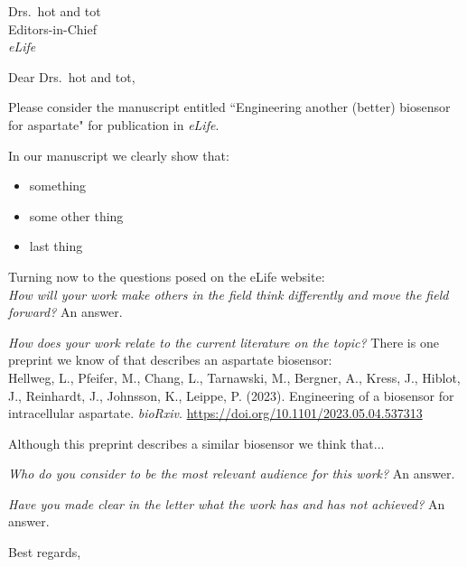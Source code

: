 \documentclass[11pt, helvetica]{letter}
\begin{document}
\begin{letter}
{
Drs.\  hot and tot\\
Editors-in-Chief\\
\textit{eLife}
}

\opening{Dear Drs.\ hot and tot,} 

\thispagestyle{fancy}

Please consider the manuscript entitled ``Engineering another (better) biosensor for aspartate" for publication in \textit{eLife}. 



In our manuscript we clearly show that:
\begin{itemize}
  \setlength\itemsep{0.1em}
  \item something
  \item some other thing
  \item last thing
\end{itemize}

Turning now to the questions posed on the eLife website: \\
\textit{How will your work make others in the field think differently and move the field forward?}
An answer.

\textit{How does your work relate to the current literature on the topic?}
There is one preprint we know of that describes an aspartate biosensor:\\
Hellweg, L., Pfeifer, M., Chang, L., Tarnawski, M., Bergner, A., Kress, J., Hiblot, J., Reinhardt, J., Johnsson, K., Leippe, P. (2023). Engineering of a biosensor for intracellular aspartate. \emph{bioRxiv}. \url{https://doi.org/10.1101/2023.05.04.537313}


Although this preprint describes a similar biosensor we think that...


\textit{Who do you consider to be the most relevant audience for this work?}
An answer.

\textit{Have you made clear in the letter what the work has and has not achieved?}
An answer.







 \closing{
Best regards,
}
  
\end{letter}
 
\end{document}
